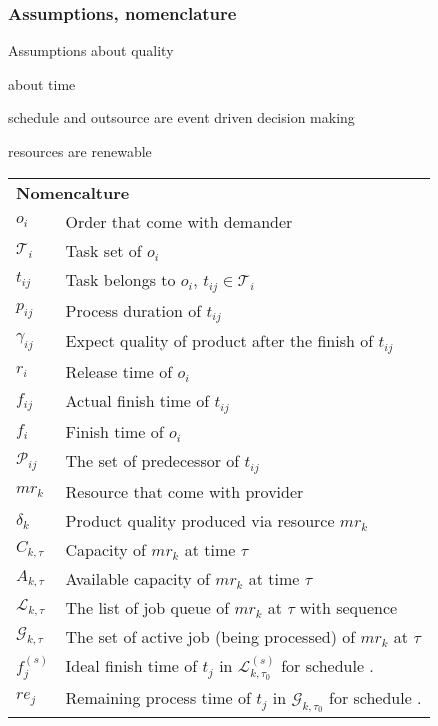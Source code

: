 
\subsubsection{Assumptions, nomenclature} %
\label{ssub:assumptions_nomenclature}
Assumptions about quality

about time

schedule and outsource are event driven decision making 

resources are renewable

\begin{table}[htbp]
  \scriptsize
\begin{tabularx}{\textwidth}{|lX|}
    \hline
    \multicolumn{2}{|l|}{\multirow{2}[0]{*}{\textbf{Nomencalture}}} \\
    \multicolumn{2}{|l|}{} \\
	$o_i$ & Order that come with demander \\
	$\mathcal{T}_i$ & Task set of $o_i$ \\
	$t_{ij}$ & Task belongs to $o_i$, $t_{ij}\in\mathcal{T}_i$ \\
	$p_{ij}$ & Process duration of $t_{ij}$\\
	$\gamma_{ij}$ & Expect quality of product after the finish of $t_{ij}$\\
	$r_i$ & Release time of $o_i$\\
	$f_{ij}$ & Actual finish time of $t_{ij}$ \\
	$f_{i}$ & Finish time of $o_i$\\
	$\mathcal{P}_{ij}$ & The set of predecessor of $t_{ij}$\\
	$mr_k$ & Resource that come with provider \\
	$\delta_k$ & Product quality produced via resource $mr_k$ \\
	$C_{k,\tau}$ & Capacity of $mr_k$ at time $\tau$\\
	$A_{k,\tau}$ & Available capacity of $mr_k$ at time $\tau$\\
	$\mathcal{L}_{k,\tau}$ & The list of job queue of $mr_k$ at $\tau$ with sequence\\
	$\mathcal{G}_{k,\tau}$ & The set of active job (being processed) of $mr_k$ at $\tau$ \\ 
	$f^{(s)}_j$ & Ideal finish time of $t_j$ in $\mathcal{L}^{(s)}_{k,\tau_0}$ for schedule . \\
	$re_j$ & Remaining process time of $t_j$ in $\mathcal{G}_{k,\tau_0}$ for schedule . \\

\end{tabularx}
\end{table}
